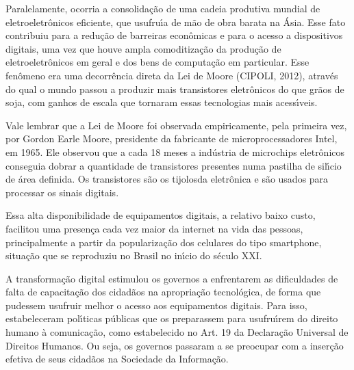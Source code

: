 \documentclass[
12pt,		%
openright,	%
twoside,  %
a4paper,			%
chapter=TITLE,		%
english,			%
french,				%
spanish,			%
brazil				%
]{USPSC-classe/USPSC}
\begin{document}
Paralelamente, ocorria a consolida\c{c}\~ao de uma cadeia produtiva mundial de eletroeletr\^onicos eficiente, que usufru\'{\i}a de m\~ao de obra barata na \'Asia. Esse fato contribuiu para a redu\c{c}\~ao de barreiras econ\^omicas e para o acesso a dispositivos digitais, uma vez que houve ampla comoditiza\c{c}\~ao da produ\c{c}\~ao de eletroeletr\^onicos em geral e dos bens de computa\c{c}\~ao em particular. Esse fen\^omeno era uma decorr\^encia direta da Lei de Moore (CIPOLI, 2012), atrav\'es do qual o mundo passou a produzir mais transistores eletr\^onicos do que gr\~aos de soja, com ganhos de escala que tornaram essas tecnologias mais acess\'{\i}veis.









Vale lembrar que a Lei de Moore foi observada empiricamente, pela primeira vez, por Gordon Earle Moore, presidente da fabricante de microprocessadores Intel, em 1965. Ele observou que a cada 18 meses a ind\'ustria de microchips eletr\^onicos conseguia dobrar a quantidade de transistores presentes numa pastilha de sil\'{\i}cio de \'area definida. Os transistores s\~ao os \textquotedbl tijolos\textquotedbl  da eletr\^onica e s\~ao usados para processar os sinais digitais.









Essa alta disponibilidade de equipamentos digitais, a relativo baixo custo, facilitou uma presen\c{c}a cada vez maior da internet na vida das pessoas, principalmente a partir da populariza\c{c}\~ao dos celulares do tipo \textquotedbl smartphone\textquotedbl , situa\c{c}\~ao que se reproduziu no Brasil no in\'{\i}cio do s\'eculo XXI.









A transforma\c{c}\~ao digital estimulou os governos a enfrentarem as dificuldades  de falta de  capacita\c{c}\~ao dos cidad\~aos na apropria\c{c}\~ao tecnol\'ogica, de forma que pudessem usufruir melhor o acesso aos equipamentos digitais. Para isso, estabeleceram pol\'{\i}ticas p\'ublicas que os preparassem para usufru\'{\i}rem do direito humano \`a comunica\c{c}\~ao, como estabelecido no Art. 19 da Declara\c{c}\~ao Universal de Direitos Humanos. Ou seja, os governos passaram a se preocupar com a inser\c{c}\~ao efetiva de seus cidad\~aos na Sociedade da Informa\c{c}\~ao.
\end{document}
